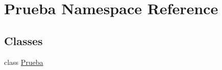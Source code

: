 \hypertarget{namespace_prueba}{}\section{Prueba Namespace Reference}
\label{namespace_prueba}
\subsection*{Classes}
\begin{DoxyCompactItemize}
\item 
class \mbox{\hyperlink{class_prueba_1_1_prueba}{Prueba}}
\end{DoxyCompactItemize}
